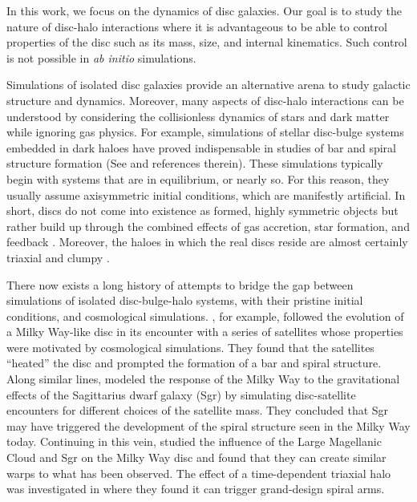 In this work, we focus on the dynamics of disc galaxies.  Our goal is
to study the nature of disc-halo interactions where it is advantageous
to be able to control properties of the disc such as its mass, size,
and internal kinematics.  Such control is not possible in {\it ab
  initio} simulations.

Simulations of isolated disc galaxies provide an alternative arena to
study galactic structure and dynamics.  Moreover, many aspects of
disc-halo interactions can be understood by considering the
collisionless dynamics of stars and dark matter while ignoring gas
physics.  For example, simulations of stellar disc-bulge systems
embedded in dark haloes have proved indispensable in studies of bar
and spiral structure formation (See \citet{Sellwood2013} and
references therein).  These simulations typically begin with systems
that are in equilibrium, or nearly so.  For this reason, they usually
assume axisymmetric initial conditions, which are manifestly
artificial.  In short, discs do not come into existence as formed,
highly symmetric objects but rather build up through the combined
effects of gas accretion, star formation, and feedback
\citep{IllustrisFeedback, Eagle}.  Moreover, the haloes in which the
real discs reside are almost certainly triaxial and clumpy
\citep{NFW,mooresubhalos,Klypin1999}.

There now exists a long history of attempts to bridge the gap between
simulations of isolated disc-bulge-halo systems, with their pristine
initial conditions, and cosmological simulations.
\citet{kazantzidis2008}, for example, followed the evolution of a
Milky Way-like disc in its encounter with a series of satellites whose
properties were motivated by cosmological simulations.  They found
that the satellites ``heated'' the disc and prompted the formation of
a bar and spiral structure.  Along similar lines, \citet{purcell2011}
modeled the response of the Milky Way to the gravitational effects of
the Sagittarius dwarf galaxy (Sgr) by simulating disc-satellite
encounters for different choices of the satellite mass.  They
concluded that Sgr may have triggered the development of the spiral
structure seen in the Milky Way today. Continuing in this vein, \citet{laporte_et_al_2016} studied the
influence of the Large Magellanic Cloud and Sgr on the Milky Way disc and
found that they can create similar warps to what has been observed. The effect of a time-dependent triaxial halo
was investigated in \citet{hu_sijacki_2016} where they found it can trigger grand-design spiral
arms. 

